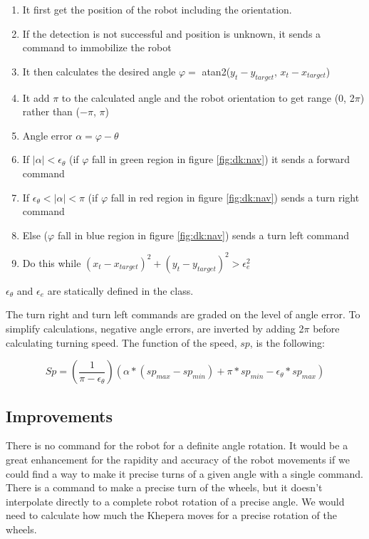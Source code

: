     \begin{enumerate}
        \item It first get the position of the robot including 
            the orientation. 
        \item If the detection is not successful and position is unknown, 
            it sends a command to immobilize the robot
        \item It then calculates the desired angle 
            $ \varphi = $
            atan2($y_{t}-y_{target}$, $x_{t}-x_{target}$)
        \item It add $\pi$ to the calculated angle and the robot orientation 
            to get range (0, 2$\pi$) rather than ($-\pi$, $\pi$)
        \item Angle error $\alpha = \varphi-\theta$ 
        \item If $|\alpha| < \epsilon_\theta$ (if $\varphi$ fall in green 
            region in figure 
            \ref{fig:dk:nav})
            it sends a forward command
        \item If $\epsilon_\theta < |\alpha| < \pi$ (if $\varphi$ fall in
            red region in figure \ref{fig:dk:nav})
            sends a turn right command
        \item Else ($\varphi$ fall in blue region in figure \ref{fig:dk:nav}) 
              sends a turn left command
        \item Do this while $(x_t-x_{target})^2+(y_t-y_{target})^2 > \epsilon_e^2$ 
    \end{enumerate}

$\epsilon_\theta$ and $\epsilon_e$ are statically defined in the class.

The turn right and turn left commands are graded on the level of angle 
error. To simplify calculations, negative angle errors,
are inverted by adding 
2$\pi$ before calculating turning speed. The function of the speed, $sp$, 
is the following:

\begin{displaymath}
    Sp = \left(\frac{1}{\pi-\epsilon_\theta}\right)\left(\alpha*(sp_{max}-sp_{min}) + 
\pi*sp_{min}-\epsilon_\theta*sp_{max}\right)
\end{displaymath}

\subsection{Improvements}
\label{sec:dk:improvements}

There is no command for the robot for a definite angle rotation. It 
would be a great enhancement for the rapidity and accuracy of the robot 
movements if we could find a way to make it precise turns of a given 
angle with a single command. There is a command to make a precise turn 
of the wheels, but it doesn’t interpolate directly to a complete robot 
rotation of a precise angle. We would need to calculate how much the 
Khepera moves for a precise rotation of the wheels.

